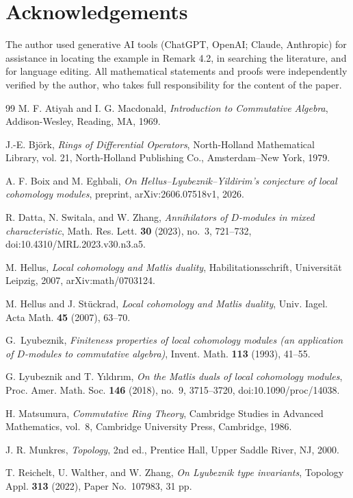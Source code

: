 \documentclass[11pt]{amsart}
\theoremstyle{definition}
\begin{document}
\section*{Acknowledgements}
The author used generative AI tools (ChatGPT, OpenAI; Claude, Anthropic) for assistance in locating the example in Remark 4.2, in searching the literature, and for language editing. All mathematical statements and proofs were independently verified by the author, who takes full responsibility for the content of the paper.
\begin{thebibliography}{99}
M. F. Atiyah and I. G. Macdonald,
\emph{Introduction to Commutative Algebra},
Addison-Wesley, Reading, MA, 1969.


J.-E. Bj\"ork, \emph{Rings of Differential Operators},
North-Holland Mathematical Library, vol. 21,
North-Holland Publishing Co., Amsterdam--New York, 1979.

A. F. Boix and M. Eghbali,
\emph{On Hellus--Lyubeznik--Yildirim's conjecture of local cohomology modules},
preprint, arXiv:2606.07518v1, 2026.

R. Datta, N. Switala, and W. Zhang,
\emph{Annihilators of $D$-modules in mixed characteristic},
Math. Res. Lett. \textbf{30} (2023), no.~3, 721--732,
doi:10.4310/MRL.2023.v30.n3.a5.

M. Hellus, \emph{Local cohomology and Matlis duality}, Habilitationsschrift, Universit\"at Leipzig, 2007, arXiv:math/0703124.

M. Hellus and J. St\"uckrad, \textit{Local cohomology and Matlis duality}, Univ. Iagel. Acta Math. \textbf{45} (2007), 63--70.

G.~Lyubeznik, \emph{Finiteness properties of local cohomology modules
(an application of $D$-modules to commutative algebra)},
Invent. Math. \textbf{113} (1993), 41--55. 

G. Lyubeznik and T. Y\i ld\i r\i m,
\emph{On the Matlis duals of local cohomology modules},
Proc. Amer. Math. Soc. \textbf{146} (2018), no.~9, 3715--3720,
doi:10.1090/proc/14038.

H. Matsumura,
\emph{Commutative Ring Theory},
Cambridge Studies in Advanced Mathematics, vol.~8,
Cambridge University Press, Cambridge, 1986.

J. R. Munkres,
\textit{Topology},
2nd ed., Prentice Hall, Upper Saddle River, NJ, 2000.

T. Reichelt, U. Walther, and W. Zhang,
\textit{On Lyubeznik type invariants},
Topology Appl. \textbf{313} (2022),
Paper No.~107983, 31 pp.


\end{thebibliography}
\end{document}

